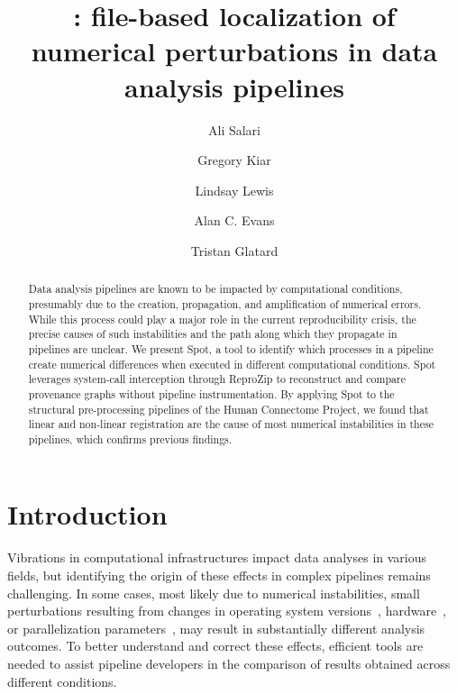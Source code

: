 \documentclass[a4paper,num-refs]{oup-contemporary}
\title{\toolname: file-based localization of numerical perturbations in data analysis pipelines}
\newcommand{\reprozip}[0]{ReproZip\xspace}
\newcommand{\toolname}[0]{Spot\xspace}
\begin{document}
\author[1]{Ali Salari}
\author[2,3]{Gregory Kiar}
\author[2]{Lindsay Lewis}
\author[2,3]{Alan C. Evans}
\author[1]{Tristan Glatard}


\maketitle

\begin{abstract} 
Data analysis pipelines are known to be impacted by computational conditions, presumably due to the creation,
propagation, and amplification of numerical errors. While this process could
play a major role in the current reproducibility crisis, the precise
causes of such instabilities and the path along which they propagate in
pipelines are unclear. We present \toolname, a tool to identify which
processes in a pipeline create numerical differences
when executed in different computational conditions. \toolname
leverages system-call interception through \reprozip to reconstruct and compare provenance
graphs without pipeline instrumentation. By applying \toolname to the
structural pre-processing pipelines of the Human Connectome
Project, we found that linear and non-linear registration are the cause of
most numerical instabilities in these pipelines, which confirms previous
findings.
\end{abstract}



\section{Introduction}


Vibrations in computational infrastructures impact data
analyses in various fields, but identifying the origin of these effects in complex pipelines
remains challenging.  In some cases, most likely due to numerical
instabilities, small perturbations resulting from changes in operating
system versions~\cite{Glatard2015}, hardware~\cite{jezequel2015estimation}, or parallelization parameters~\cite{diethelm2011limits},
may result in substantially different analysis outcomes. To better understand and 
correct these effects, efficient tools are 
needed to assist pipeline developers
in the comparison of results obtained across different conditions. 
\end{document}
